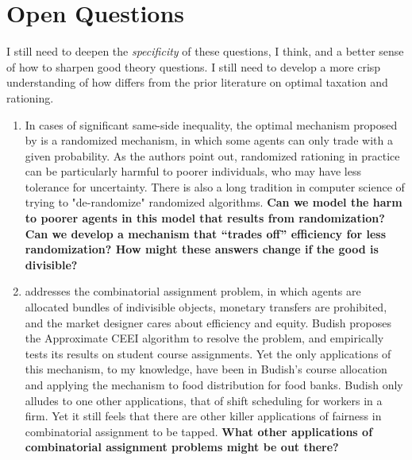 \documentclass[JEL]{AEA}
\begin{document}
\section{Open Questions}

I still need to deepen the \emph{specificity} of these questions, I think, and a better sense of how to sharpen good theory questions. I still need to develop a more crisp understanding of how \cite{dworczak-2020} differs from the prior literature on optimal taxation and rationing.

\begin{enumerate}
    \item In cases of significant same-side inequality, the optimal mechanism proposed by \cite{dworczak-2020} is a randomized mechanism, in which some agents can only trade with a given probability. As the authors point out, randomized rationing in practice can be particularly harmful to poorer individuals, who may have less tolerance for uncertainty. There is also a long tradition in computer science of trying to "de-randomize" randomized algorithms. \textbf{Can we model the harm to poorer agents in this model that results from randomization? Can we develop a mechanism that ``trades off'' efficiency for less randomization? How might these answers change if the good is divisible?}
    
    \item \cite{budish-2011} addresses the combinatorial assignment problem, in which agents are allocated bundles of indivisible objects, monetary transfers are prohibited, and the market designer cares about efficiency and equity. Budish proposes the Approximate CEEI algorithm to resolve the problem, and empirically tests its results on student course assignments. Yet the only applications of this mechanism, to my knowledge, have been in Budish's course allocation and \cite{prendergast-2017} applying the mechanism to food distribution for food banks. Budish only alludes to one other applications, that of shift scheduling for workers in a firm. Yet it still feels that there are other killer applications of fairness in combinatorial assignment to be tapped. \textbf{What other applications of combinatorial assignment problems might be out there?}
    

\end{enumerate}
\end{document}
